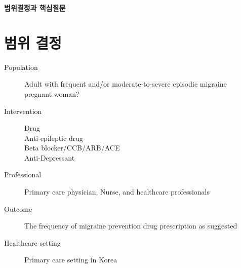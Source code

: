\documentclass{paper}
\begin{document}
\Large \textbf{범위결정과 핵심질문} \normalsize

\section{범위 결정}
\begin{description}
	\item[Population] Adult with frequent and/or moderate-to-severe episodic migraine \\ pregnant woman?
	\item[Intervention] Drug \\Anti-epileptic drug\\Beta blocker/CCB/ARB/ACE\\Anti-Depressant
	\item[Professional] Primary care physician, Nurse, and healthcare professionals
	\item[Outcome] The frequency of migraine prevention drug prescription as suggested
	\item[Healthcare setting] Primary care setting in Korea
\end{description}

\newpage
\end{document}
